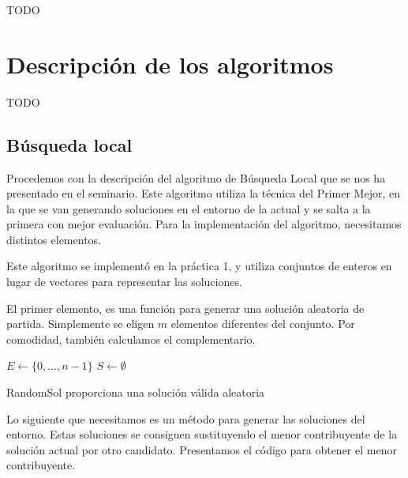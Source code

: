 \documentclass{article}
\begin{document}
TODO

\pagebreak

\section{Descripción de los algoritmos}

TODO

\pagebreak

\subsection{Búsqueda local}

Procedemos con la descripción del algoritmo de Búsqueda Local que se nos ha presentado en el seminario. 
Este algoritmo utiliza la técnica del Primer Mejor, en la que se van generando soluciones en el entorno de la actual y se
salta a la primera con mejor evaluación. Para la implementación del algoritmo, necesitamos distintos elementos.

Este algoritmo se implementó en la práctica 1, y utiliza conjuntos de enteros en lugar de vectores para representar
las soluciones.

El primer elemento, es una función para generar una solución aleatoria de partida. Simplemente se eligen $m$ elementos 
diferentes del conjunto. Por comodidad, también calculamos el complementario.

\begin{algorithm}[H]
	\DontPrintSemicolon %
	$E \gets \{0,\ldots, n-1\}$ 
	$S \gets \emptyset$ 
	\;
	 
	\caption{{\sc RandomSol} proporciona una solución válida aleatoria}
	\label{alg:randomsol}
\end{algorithm}

Lo siguiente que necesitamos es un método para generar las soluciones del entorno. Estas soluciones se consiguen sustituyendo
el menor contribuyente de la solución actual por otro candidato. Presentamos el código para obtener el menor contribuyente.
\end{document}
